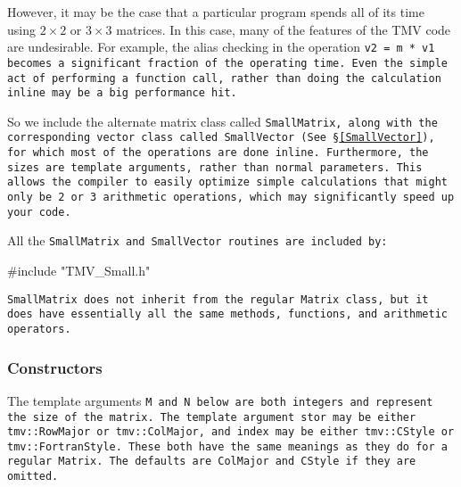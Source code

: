 However, it may be the case that a particular program spends all of its
time using $2 \times 2$ or $3 \times 3$ matrices.  In this case, 
many of the features of the TMV code are undesirable.  For example, 
the alias checking in the operation \tt{v2 = m * v1} becomes a significant
fraction of the operating time.  Even the simple act of performing a function
call, rather than doing the calculation inline may be a big performance hit.

So we include the alternate matrix class called \tt{SmallMatrix}, along 
with the corresponding vector class called \tt{SmallVector} (See \S\ref{SmallVector}), 
for which most of 
the operations are done inline.  Furthermore, the sizes are template arguments,
rather than normal parameters.  This allows the compiler to easily optimize
simple calculations that might only be 2 or 3 arithmetic operations, which
may significantly speed up your code.

All the \tt{SmallMatrix} and \tt{SmallVector} routines are included by:
\begin{tmvcode}
#include "TMV_Small.h"
\end{tmvcode}

\tt{SmallMatrix} does not inherit from the regular \tt{Matrix} class, 
but it does have 
essentially all the same methods, functions, and arithmetic operators. 

\subsubsection{Constructors}
\label{SmallMatrix_Constructors}

The template arguments \tt{M} and \tt{N} below are both integers and
represent the size of the matrix.
The template argument \tt{stor} may be either \tt{tmv::RowMajor} or
\tt{tmv::ColMajor}, and
 \tt{index} may be either \tt{tmv::CStyle} or
\tt{tmv::FortranStyle}.  These both have the same meanings as they do 
for a regular \tt{Matrix}. The defaults are \tt{ColMajor} and \tt{CStyle} if they
are omitted.


